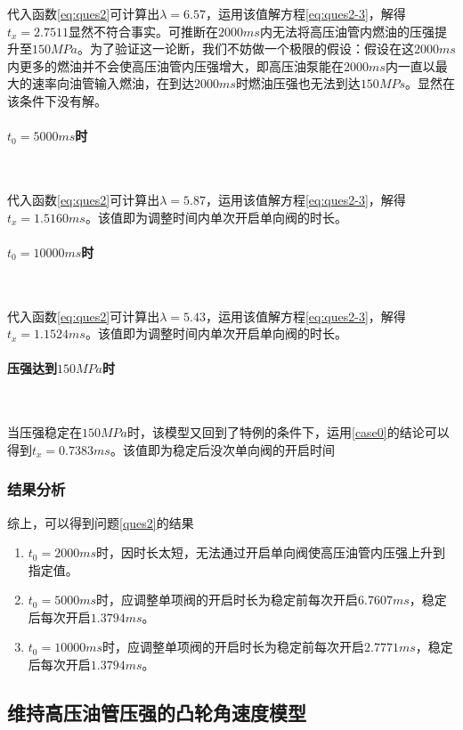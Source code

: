 \documentclass{cumcmthesis}
\begin{document}
代入函数\cref{eq:ques2}可计算出$\lambda=6.57$，运用该值解方程\cref{eq:ques2-3}，解得$t_{x} =2.7511$显然不符合事实。可推断在$2000ms$内无法将高压油管内燃油的压强提升至$150MPa$。为了验证这一论断，我们不妨做一个极限的假设：假设在这$2000ms$内更多的燃油并不会使高压油管内压强增大，即高压油泵能在$2000ms$内一直以最大的速率向油管输入燃油，在到达$2000ms$时燃油压强也无法到达$150MPs$。显然在该条件下没有解。

\paragraph{$t_{0}=5000ms$时}~{}

代入函数\cref{eq:ques2}可计算出$\lambda=5.87$，运用该值解方程\cref{eq:ques2-3}，解得$t_{x} = 1.5160ms$。该值即为调整时间内单次开启单向阀的时长。
\paragraph{$t_{0}=10000ms$时}~{}

代入函数\cref{eq:ques2}可计算出$\lambda=5.43$，运用该值解方程\cref{eq:ques2-3}，解得$t_{x} = 1.1524ms$。该值即为调整时间内单次开启单向阀的时长。

\paragraph{压强达到$150MPa$时}~{}

当压强稳定在$150MPa$时，该模型又回到了特例的条件下，运用\ref{case0}的结论可以得到$t_{x} = 0.7383ms$。该值即为稳定后没次单向阀的开启时间

\subsubsection{结果分析}

综上，可以得到问题\ref{ques2}的结果
\begin{enumerate}
	\item $t_{0}=2000ms$时，因时长太短，无法通过开启单向阀使高压油管内压强上升到指定值。
	\item $t_{0}=5000ms$时，应调整单项阀的开启时长为稳定前每次开启$6.7607ms$，稳定后每次开启$1.3794ms$。
	\item$t_{0}=10000ms$时，应调整单项阀的开启时长为稳定前每次开启$2.7771ms$，稳定后每次开启$1.3794ms$。
\end{enumerate}
\subsection{维持高压油管压强的凸轮角速度模型}
\end{document}
